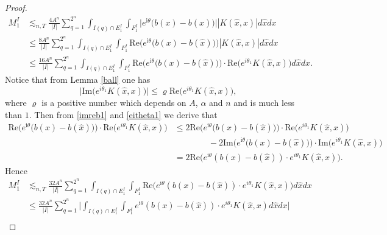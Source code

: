 \documentclass[oneside,english,a4wide]{amsart}
\numberwithin{equation}{section}
\numberwithin{figure}{section}
\theoremstyle{plain}
\theoremstyle{plain}
\theoremstyle{definition}
\theoremstyle{plain}
\theoremstyle{remark}
\theoremstyle{definition}
\theoremstyle{remark}
\theoremstyle{definition}
\newcommand{\8}{\infty}
\begin{document}
\begin{proof}
\begin{equation*}
		\begin{aligned}
			M_1^I{}&
			\lesssim_{n,T}\frac{4A^n}{|I|}\sum_{q=1}^{2^n}\int_{I(q)\cap E_1^I}\int_{F_1^I} \big|e^{\mathrm{i}{\theta}}\big(b(x)-b(\hat{x})\big)\big||K(\hat{x},x)|d\hat{x}dx\\
			&\le \frac{8A^n}{|I|}\sum_{q=1}^{2^n}\int_{I(q)\cap E_1^I}\int_{F_1^I} \mathrm{Re}\Big(e^{\mathrm{i}{\theta}}\big(b(x)-b(\hat{x})\big)\Big)|K(\hat{x},x)|d\hat{x}dx\\
			&\le  \frac{16 A^n}{|I|}\sum_{q=1}^{2^n}\int_{I(q)\cap E_1^I}\int_{F_1^I} \mathrm{Re}\Big(e^{\mathrm{i}{\theta}}\big(b(x)-b(\hat{x})\big)\Big)\cdot\text{Re}\big(e^{i\theta_1}K(\hat{x},x)\big)d\hat{x}dx.
		\end{aligned}
	\end{equation*}
	Notice that from Lemma \ref{ball} one has 
	\begin{equation}\label{eitheta1}
		\big|\mathrm{Im}\big(e^{i\theta_1}K(\hat{x},x)\big)\big|\le \varrho\mathrm{Re}\big(e^{i\theta_1}K(\hat{x},x)\big),
	\end{equation}
	where $\varrho$ is a positive number which depends on $A$, $\alpha$ and $n$ and is much less than $1$.
	Then from \eqref{imreb1} and \eqref{eitheta1} we derive that
	\begin{equation*}
		\begin{aligned}
			\mathrm{Re}\Big(e^{\mathrm{i}{\theta}}\big(b(x)-b(\hat{x})\big)\Big)\cdot\text{Re}\big(e^{i\theta_1}K(\hat{x},x)\big)
			&\le 2\mathrm{Re}\Big(e^{\mathrm{i}{\theta}}\big(b(x)-b(\hat{x})\big)\Big)\cdot\text{Re}\big(e^{i\theta_1}K(\hat{x},x)\big)\\
			& \quad \quad \quad \quad-2\mathrm{Im}\Big(e^{\mathrm{i}{\theta}}\big(b(x)-b(\hat{x})\big)\Big)\cdot\text{Im}\big(e^{i\theta_1}K(\hat{x},x)\big)\\
			&=2\mathrm{Re}\Big(e^{\mathrm{i}{\theta}}(b(x)-b(\hat{x}))\cdot e^{i\theta_1}K(\hat{x},x)\Big).
		\end{aligned}
	\end{equation*}
	Hence
	\begin{equation*}\label{M1I}
		\begin{aligned}
			M_1^I{}&
			\lesssim_{n,T} \frac{32A^n}{|I|}\sum_{q=1}^{2^n}\int_{I(q)\cap E_1^I}\int_{F_1^I} \mathrm{Re}\Big(e^{\mathrm{i}{\theta}}(b(x)-b(\hat{x}))\cdot e^{i\theta_1}K(\hat{x},x)\Big)d\hat{x}dx\\
			&\le \frac{32A^n}{|I|}\sum_{q=1}^{2^n}\bigg|\int_{I(q)\cap E_1^I}\int_{F_1^I} e^{\mathrm{i}{\theta}}(b(x)-b(\hat{x}))\cdot e^{i\theta_1}K(\hat{x},x)d\hat{x}dx\bigg|\\

\end{aligned}
\end{equation*}
\end{proof}
\end{document}
